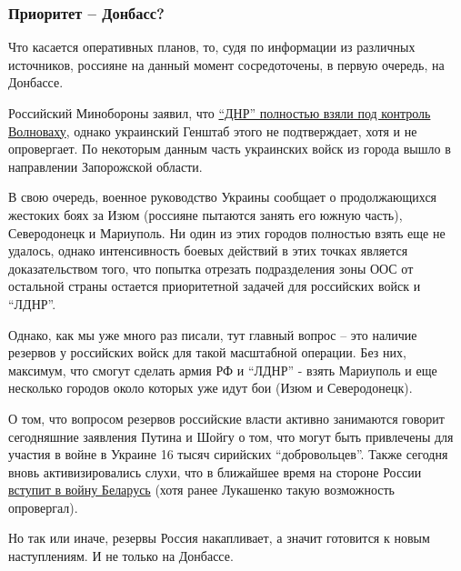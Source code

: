  
 
 
 
 

\subsubsection{Приоритет – Донбасс?}

Что касается оперативных планов, то, судя по информации из различных
источников, россияне на данный момент сосредоточены, в первую очередь, на
Донбассе.

Российский Минобороны заявил, что \href{https://strana.news/news/381243-volnovakha-minoborony-rossii-zajavilo-chto-vojska-dnr-polnostju-kontrolirujut-horod.html}{\enquote{ДНР} полностью взяли под контроль Волноваху},
однако украинский Генштаб этого не подтверждает, хотя и не опровергает. По
некоторым данным часть украинских войск из города вышло в направлении
Запорожской области.

В свою очередь, военное руководство Украины сообщает о продолжающихся жестоких
боях за Изюм (россияне пытаются занять его южную часть), Северодонецк и
Мариуполь. Ни один из этих городов полностью взять еще не удалось, однако
интенсивность боевых действий в этих точках является доказательством того, что
попытка отрезать подразделения зоны ООС от остальной страны остается
приоритетной задачей для российских войск и \enquote{ЛДНР}.

Однако, как мы уже много раз писали, тут главный вопрос – это наличие резервов
у российских войск для такой масштабной операции. Без них, максимум, что смогут
сделать армия РФ и \enquote{ЛДНР} - взять Мариуполь и еще несколько городов около
которых уже идут бои (Изюм и Северодонецк).  

О том, что вопросом резервов российские власти активно занимаются говорит
сегодняшние заявления Путина и Шойгу о том, что могут быть привлечены для
участия в войне в Украине 16 тысяч сирийских \enquote{добровольцев}. Также
сегодня вновь активизировались слухи, что в ближайшее время на стороне России
\href{https://strana.news/news/381326-belorusskaja-armija-mozhet-vstupit-v-vojnu-v-ukraine-11-marta-v-2100.html}{вступит
в войну Беларусь} (хотя ранее Лукашенко такую возможность опровергал).

Но так или иначе, резервы Россия накапливает, а значит готовится к новым
наступлениям. И не только на Донбассе.
